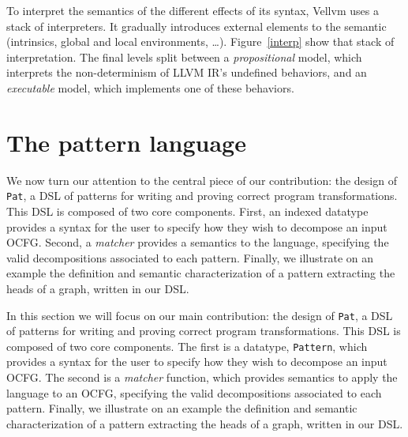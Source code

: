 \documentclass[11pt]{article}
\newcommand{\inlinecoq}[1]{\mbox{\lstinline[style=customcoq,columns=fixed,basewidth=.48em]{#1}}}
\newcommand{\ilc}[1]{\inlinecoq{#1}}
\newcommand{\yz}[1]{\textcolor{ForestGreen}{#1}}
\newcommand{\yzt}[1]{\textcolor{ForestGreen!50}{#1}}
\newcommand{\ocfg}{OCFG\xspace}
\newcommand{\pat}{\texttt{Pat}\xspace}
\begin{document}
To interpret the semantics of the different effects of its syntax, Vellvm uses a stack of interpreters. It gradually introduces external elements to the semantic (intrinsics, global and local environments, \ldots). Figure~\ref{interp} show that stack of interpretation. The final levels split between a \emph{propositional} model, which interprets the non-determinism of LLVM IR's undefined behaviors, and an \emph{executable} model, which implements one of these behaviors.

\section{The pattern language}
\label{sec:lang}




\yzt{We now turn our attention to the central piece of our contribution: the design of \pat{}, a DSL of patterns for writing and proving correct program transformations. This DSL is composed of two core components. First, an indexed datatype provides a syntax for the user to specify how they wish to decompose an input \ocfg. Second, a \emph{matcher} provides a semantics to the language, specifying the valid decompositions associated to each pattern. Finally, we illustrate on an example the definition and semantic characterization of a pattern extracting the heads of a graph, written in our DSL.}

In this section we will focus on our main contribution: the design of \pat{}, a DSL of patterns for writing and proving correct program transformations. This DSL is composed of two core components. The first is a datatype, \ilc{Pattern}, which provides a syntax for the user to specify how they wish to decompose an input \ocfg. The second is a \emph{matcher} function, which provides semantics to apply the language to an \ocfg{}, specifying the valid decompositions associated to each pattern. Finally, we illustrate on an example the definition and semantic characterization of a pattern extracting the heads of a graph, written in our DSL\@.
\end{document}
